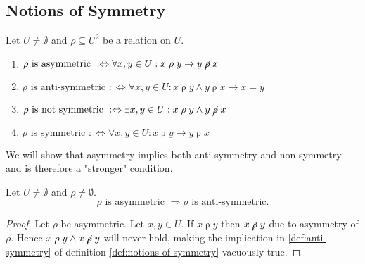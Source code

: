 \subsection{Notions of Symmetry}

\newcommand{\relsymbol}{\rho}
\newcommand{\reluniverse}{U}
\newcommand{\rel}[3][\relsymbol]{#2\mathrel{#1}#3}
\newcommand{\nrel}[3][\cancel{\relsymbol}]{#2\mathrel{#1}#3}

\begin{definition}

  Let $U \neq \emptyset$ and $\relsymbol \subseteq \reluniverse^2$ be a relation on $U$.
  \begin{enumerate}
    \item $\relsymbol \text{ is asymmetric } :\Leftrightarrow
            \forall x, y \in \reluniverse: \rel{x}{y} \rightarrow \nrel{y}{x}$
          \label{def:asymmetry}
    \item $\relsymbol \text{ is anti-symmetric } :\Leftrightarrow
            \forall x, y \in \reluniverse: \rel{x}{y} \land \rel{y}{x} \rightarrow x = y$
          \label{def:anti-symmetry}
    \item $\relsymbol \text{ is not symmetric } :\Leftrightarrow
            \exists x, y \in \reluniverse: \rel{x}{y} \land \nrel{y}{x}$
          \label{def:no-symmetry}
    \item $\relsymbol \text{ is symmetric } :\Leftrightarrow
            \forall x, y \in \reluniverse: \rel{x}{y} \rightarrow \rel{y}{x}$
          \label{def:symmetry}
  \end{enumerate}
  \label{def:notions-of-symmetry}
\end{definition}

We will show that asymmetry implies both anti-symmetry and non-symmetry and is therefore a
"stronger" condition.
\begin{claim}
  Let $\reluniverse \neq \emptyset$ and $\relsymbol \neq \emptyset$.
  \[
    \relsymbol \text{ is asymmetric } \Rightarrow \relsymbol \text{ is anti-symmetric.}
  \]
\end{claim}

\begin{proof}
  Let $\relsymbol$ be asymmetric. Let $x, y \in \reluniverse$.
  If $\rel{x}{y}$ then $\nrel{x}{y}$ due to asymmetry of $\relsymbol$.
  Hence $\rel{x}{y} \land \nrel{x}{y}$ will never hold, making the implication in
  \ref{def:anti-symmetry} of definition \ref{def:notions-of-symmetry} vacuously true.

\end{proof}

